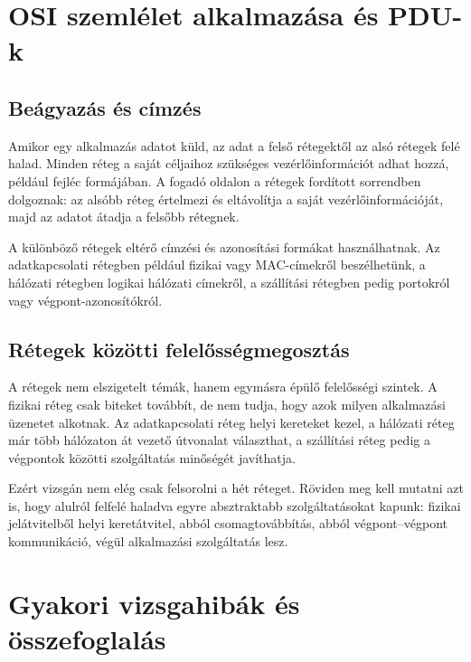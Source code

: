 \begin{center}

\end{center}

\section{OSI szemlélet alkalmazása és PDU-k}

\subsection{Beágyazás és címzés}

Amikor egy alkalmazás adatot küld, az adat a felső rétegektől az alsó rétegek felé halad. Minden réteg a saját céljaihoz szükséges vezérlőinformációt adhat hozzá, például fejléc formájában. A fogadó oldalon a rétegek fordított sorrendben dolgoznak: az alsóbb réteg értelmezi és eltávolítja a saját vezérlőinformációját, majd az adatot átadja a felsőbb rétegnek.

A különböző rétegek eltérő címzési és azonosítási formákat használhatnak. Az adatkapcsolati rétegben például fizikai vagy MAC-címekről beszélhetünk, a hálózati rétegben logikai hálózati címekről, a szállítási rétegben pedig portokról vagy végpont-azonosítókról.

\subsection{Rétegek közötti felelősségmegosztás}

A rétegek nem elszigetelt témák, hanem egymásra épülő felelősségi szintek. A fizikai réteg csak biteket továbbít, de nem tudja, hogy azok milyen alkalmazási üzenetet alkotnak. Az adatkapcsolati réteg helyi kereteket kezel, a hálózati réteg már több hálózaton át vezető útvonalat választhat, a szállítási réteg pedig a végpontok közötti szolgáltatás minőségét javíthatja.

Ezért vizsgán nem elég csak felsorolni a hét réteget. Röviden meg kell mutatni azt is, hogy alulról felfelé haladva egyre absztraktabb szolgáltatásokat kapunk: fizikai jelátvitelből helyi keretátvitel, abból csomagtovábbítás, abból végpont--végpont kommunikáció, végül alkalmazási szolgáltatás lesz.

\section{Gyakori vizsgahibák és összefoglalás}

